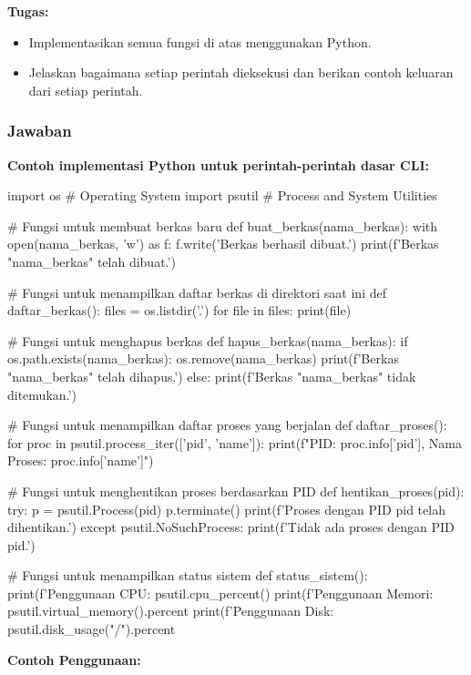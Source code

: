 \documentclass[12pt]{article}
\begin{document}
\textbf{Tugas:}
\begin{itemize}
    \item Implementasikan semua fungsi di atas menggunakan Python.
    \item Jelaskan bagaimana setiap perintah dieksekusi dan berikan contoh keluaran dari setiap perintah.
\end{itemize}

\subsubsection*{Jawaban}

\textbf{Contoh implementasi Python untuk perintah-perintah dasar CLI:}

\begin{python}
import os # Operating System
import psutil # Process and System Utilities

# Fungsi untuk membuat berkas baru
def buat_berkas(nama_berkas):
    with open(nama_berkas, 'w') as f:
        f.write('Berkas berhasil dibuat.\n')
    print(f'Berkas "{nama_berkas}" telah dibuat.')

# Fungsi untuk menampilkan daftar berkas di direktori saat ini
def daftar_berkas():
    files = os.listdir('.')
    for file in files:
        print(file)

# Fungsi untuk menghapus berkas
def hapus_berkas(nama_berkas):
    if os.path.exists(nama_berkas):
        os.remove(nama_berkas)
        print(f'Berkas "{nama_berkas}" telah dihapus.')
    else:
        print(f'Berkas "{nama_berkas}" tidak ditemukan.')

# Fungsi untuk menampilkan daftar proses yang berjalan
def daftar_proses():
    for proc in psutil.process_iter(['pid', 'name']):
        print(f"PID: {proc.info['pid']}, Nama Proses: {proc.info['name']}")

# Fungsi untuk menghentikan proses berdasarkan PID
def hentikan_proses(pid):
    try:
        p = psutil.Process(pid)
        p.terminate()
        print(f'Proses dengan PID {pid} telah dihentikan.')
    except psutil.NoSuchProcess:
        print(f'Tidak ada proses dengan PID {pid}.')

# Fungsi untuk menampilkan status sistem
def status_sistem():
    print(f'Penggunaan CPU: {psutil.cpu_percent()}%
    print(f'Penggunaan Memori: {psutil.virtual_memory().percent}%
    print(f'Penggunaan Disk: {psutil.disk_usage("/").percent}%
\end{python}
\textbf{Contoh Penggunaan:}
\end{document}

